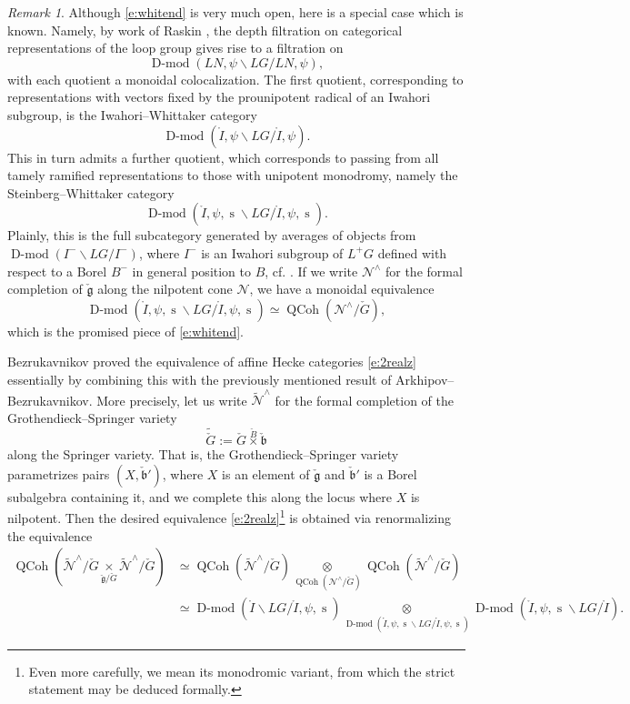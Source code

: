 \documentclass[10pt]{amsart}
\newcommand{\cB}{\check{B}}
\newcommand{\fg}{\mathfrak{g}}
\newcommand{\on}{\operatorname}
\newcommand{\Dmod}{\on{D-mod}}
\theoremstyle{remark}
\newtheorem{re}[subsubsection]{Remark}
\newcommand{\sN}{\mathscr{N}}
\newcommand{\fb}{\mathfrak{b}}
\numberwithin{equation}{section}
\newcommand{\cfg}{\check{\fg}}
\newcommand{\cG}{\check{G}}
\newcommand{\QCoh}{\on{QCoh}}
\begin{document}
\begin{re}Although \eqref{e:whitend} is very much open, here is a special case 
which is known. Namely, by work of Raskin \cite{whit}, the depth filtration on categorical 
representations of the loop group gives rise to a filtration on $$\Dmod(LN, \psi 
\backslash LG / LN, \psi),$$with each quotient a monoidal colocalization. The 
first quotient, corresponding to representations with vectors fixed by 
the prounipotent radical of an Iwahori subgroup, is the Iwahori--Whittaker 
category 
%
\[
     \Dmod(\mathring{I}, \psi \backslash LG / \mathring{I}, \psi). 
\]
%	
This in turn admits a further quotient, which corresponds to passing from all 
tamely ramified representations to those with unipotent monodromy, namely the 
Steinberg--Whittaker category 
%
\[ 
   \Dmod(\mathring{I}, \psi, \on{s} \backslash LG / \mathring{I}, \psi, 
   \on{s}). 
\]	
%	
Plainly, this is the full subcategory generated by averages of objects from $\Dmod(I^- \backslash LG / I^-)$, where $I^-$ is an Iwahori subgroup of $L^+G$ defined with respect to a Borel $B^-$ in general position to $B$, cf. \cite{ahc}. If we write $\sN^{\wedge}$ for the formal completion of $\cfg$ along the 
nilpotent cone $\sN$, we have a monoidal equivalence
%
\[ 
    \Dmod(\mathring{I}, \psi, \on{s} \backslash LG / \mathring{I}, \psi, 
    \on{s}) \simeq \QCoh( \sN^\wedge / \cG),
\]	
%	
which is the promised piece of \eqref{e:whitend}. 


 Bezrukavnikov proved the equivalence of affine Hecke categories \eqref{e:2realz} 
essentially by combining this with the previously mentioned result of Arkhipov--Bezrukavnikov. More 
precisely, let us write $\widetilde{\sN}^\wedge$ for 
the formal completion of the Grothendieck--Springer variety
$$\widetilde{\cG} := \cG \overset \cB \times \check{\fb}$$ along the Springer variety. That is, the Grothendieck--Springer variety parametrizes pairs $(X, \check{\fb}')$, where $X$ is an element of $\cfg$ and $\check{\fb}'$ is a Borel subalgebra containing it, and we complete this along the locus where $X$ is nilpotent. Then the desired equivalence \eqref{e:2realz}\footnote{Even more carefully, we mean its 
monodromic variant, from which the strict statement may be deduced formally.} is 
obtained via renormalizing the equivalence
%
\begin{align*} \QCoh( \widetilde{\sN}^\wedge / \cG  \underset {\cfg / \cG} 
\times 
\widetilde{\sN}^\wedge / \cG) 
& \simeq \QCoh(\widetilde{\sN}^\wedge / \cG)  \underset {\QCoh(\sN^\wedge / \cG)} 
\otimes  \QCoh(\widetilde{\sN}^\wedge / \cG ) \\ & \simeq \Dmod(\mathring{I} 
\backslash LG / \mathring{I}, \psi, \on{s}) \underset {\Dmod(\mathring{I}, 
\psi, \on{s} \backslash LG / \mathring{I}, \psi, \on{s})} \otimes 
\Dmod(\mathring{I}, \psi, \on{s} \backslash LG / \mathring{I}).  \end{align*} 
%


\end{re}
\end{document}
